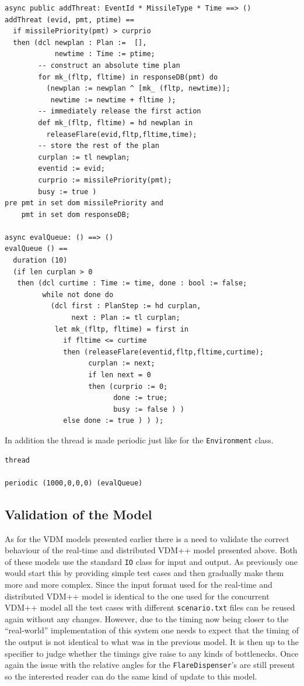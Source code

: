\documentclass{overturerepchap}
\begin{document}
\begin{lstlisting}
async public addThreat: EventId * MissileType * Time ==> ()
addThreat (evid, pmt, ptime) ==
  if missilePriority(pmt) > curprio
  then (dcl newplan : Plan :=  [],
            newtime : Time := ptime;
        -- construct an absolute time plan
        for mk_(fltp, fltime) in responseDB(pmt) do
          (newplan := newplan ^ [mk_ (fltp, newtime)];
           newtime := newtime + fltime );
        -- immediately release the first action
        def mk_(fltp, fltime) = hd newplan in
          releaseFlare(evid,fltp,fltime,time);
        -- store the rest of the plan
        curplan := tl newplan;
        eventid := evid;
        curprio := missilePriority(pmt);
        busy := true )
pre pmt in set dom missilePriority and
    pmt in set dom responseDB;

async evalQueue: () ==> ()
evalQueue () ==
  duration (10)
  (if len curplan > 0
   then (dcl curtime : Time := time, done : bool := false;
         while not done do
           (dcl first : PlanStep := hd curplan,
                next : Plan := tl curplan;
            let mk_(fltp, fltime) = first in
              if fltime <= curtime
              then (releaseFlare(eventid,fltp,fltime,curtime);
                    curplan := next;
                    if len next = 0
                    then (curprio := 0; 
                          done := true; 
                          busy := false ) )
              else done := true ) ) );
\end{lstlisting}

In addition the thread is made periodic just like for the 
\texttt{Environment} class.

\begin{lstlisting}
thread

periodic (1000,0,0,0) (evalQueue)
\end{lstlisting}

\subsection{Validation of the Model}

As for the VDM models presented earlier there is a need to
validate the correct behaviour of the real-time and distributed 
VDM++ model presented
above. Both of these models use the standard
\texttt{IO} class for input and output. As previously one would start 
this by providing simple test cases and then gradually make them more
and more complex. Since the input format used for the real-time and
distributed VDM++ model is identical to the one used for the
concurrent VDM++ model all the test cases with different
\texttt{scenario.txt} files can be reused again without any changes.
However, due to the timing now being closer to the ``real-world''
implementation of this system one needs to expect that the timing of
the output is not identical to what was in the previous model. It is
then up to the specifier to judge whether the timings give raise to
any kinds of bottlenecks. Once again the issue with the relative
angles for the
\texttt{FlareDispenser}'s are still present so the interested reader
can do the same kind of update to this model.
\end{document}
